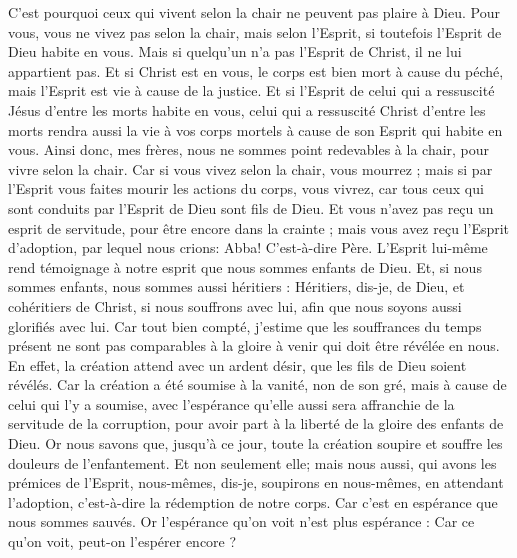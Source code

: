 \begin{multicols}{2}
C'est pourquoi ceux qui vivent selon la chair ne peuvent pas plaire à Dieu.
Pour vous, vous ne vivez pas selon la chair, mais selon l'Esprit, si toutefois l'Esprit de Dieu habite en vous. Mais si quelqu'un n'a pas l'Esprit de Christ, il ne lui appartient pas.
Et si Christ est en vous, le corps est bien mort à cause du péché, mais l'Esprit est vie à cause de la justice.
Et si l'Esprit de celui qui a ressuscité Jésus d'entre les morts habite en vous, celui qui a ressuscité Christ d'entre les morts rendra aussi la vie à vos corps mortels à cause de son Esprit qui habite en vous.
Ainsi donc, mes frères, nous ne sommes point redevables à la chair, pour vivre selon la chair.
Car si vous vivez selon la chair, vous mourrez ; mais si par l'Esprit vous faites mourir les actions du corps, vous vivrez,
car tous ceux qui sont conduits par l'Esprit de Dieu sont fils de Dieu.
Et vous n'avez pas reçu un esprit de servitude, pour être encore dans la crainte ; mais vous avez reçu l'Esprit d'adoption, par lequel nous crions: Abba! C'est-à-dire Père.
L'Esprit lui-même rend témoignage à notre esprit que nous sommes enfants de Dieu.
Et, si nous sommes enfants, nous sommes aussi héritiers : Héritiers, dis-je, de Dieu, et cohéritiers de Christ, si nous souffrons avec lui, afin que nous soyons aussi glorifiés avec lui.
Car tout bien compté, j'estime que les souffrances du temps présent ne sont pas comparables à la gloire à venir qui doit être révélée en nous.
En effet, la création attend avec un ardent désir, que les fils de Dieu soient révélés.
Car la création a été soumise à la vanité, non de son gré, mais à cause de celui qui l'y a soumise,
avec l'espérance qu'elle aussi sera affranchie de la servitude de la corruption, pour avoir part à la liberté de la gloire des enfants de Dieu.
Or nous savons que, jusqu'à ce jour, toute la création soupire et souffre les douleurs de l'enfantement.
Et non seulement elle; mais nous aussi, qui avons les prémices de l'Esprit, nous-mêmes, dis-je, soupirons en nous-mêmes, en attendant l'adoption, c'est-à-dire la rédemption de notre corps.
Car c'est en espérance que nous sommes sauvés. Or l'espérance qu'on voit n'est plus espérance : Car ce qu'on voit, peut-on l'espérer encore ?

\end{multicols}
